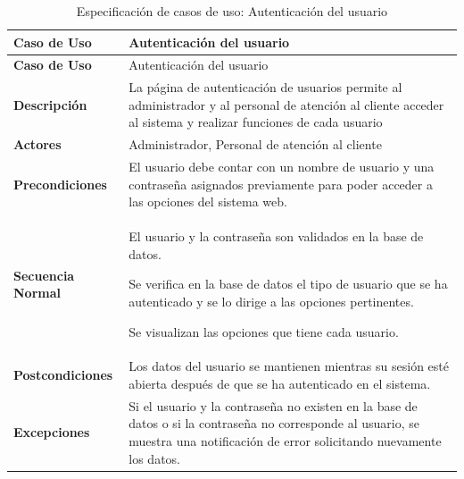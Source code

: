 	\begingroup
	\onehalfspacing
	
	\begin{longtable}{m{4cm} m{10.5cm}}
		\caption[Especificación de casos de uso: Autenticación del usuario]{\newline Especificación de casos de uso: Autenticación del usuario} \label{tab:tabla3_2}\\
		\toprule
		\textbf{Caso de Uso} & Autenticación del usuario \\
		\midrule
		\endfirsthead
		
		\textbf{Caso de Uso} & Autenticación del usuario \\
		\midrule
		\endhead
		
		
		\bottomrule
		\endlastfoot
		
		\textbf{Descripción} & La página de autenticación de usuarios permite al administrador y al personal de atención al cliente acceder al sistema y realizar funciones de cada usuario \\ \hline
		\textbf{Actores} & Administrador, Personal de atención al cliente \\ \hline
		\textbf{Precondiciones} & El usuario debe contar con un nombre de usuario y una contraseña asignados previamente para poder acceder a las opciones del sistema web. \\ \hline
		\textbf{Secuencia Normal} & 
			El usuario y la contraseña son validados en la base de datos.
			
			Se verifica en la base de datos el tipo de usuario que se ha autenticado y se lo dirige a las opciones pertinentes.
			
			Se visualizan las opciones que tiene cada usuario. \\ \hline
		\textbf{Postcondiciones} & Los datos del usuario se mantienen mientras su sesión esté abierta después de que se ha autenticado en el sistema.\\ \hline
		\textbf{Excepciones} & Si el usuario y la contraseña no existen en la base de datos o si la contraseña no corresponde al usuario, se muestra una notificación de error solicitando nuevamente los datos. \\		
	\end{longtable}
	
	\endgroup 
	\vspace{-6pt}  %
	
